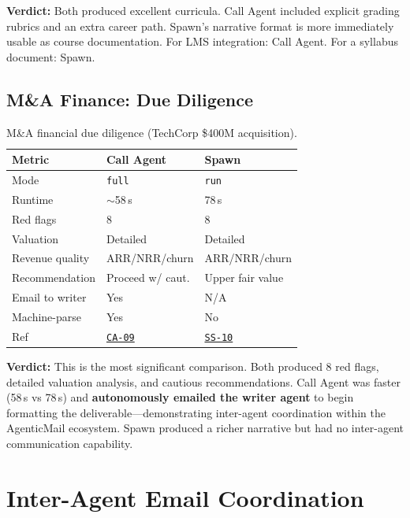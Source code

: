 \documentclass[11pt,twocolumn]{article}
\newcommand{\win}[1]{\cellcolor{winner}#1}
\newcommand{\lose}[1]{\cellcolor{loser}#1}
\newcommand{\tie}[1]{\cellcolor{tied}#1}
\newcommand{\ghbase}{https://github.com/agenticmail/agenticmail/blob/main/research/agent-rpc-vs-spawn}
\begin{document}
\textbf{Verdict:} Both produced excellent curricula. Call Agent included explicit grading rubrics and an extra career path. Spawn's narrative format is more immediately usable as course documentation. For LMS integration: Call Agent. For a syllabus document: Spawn.

\subsection{M\&A Finance: Due Diligence}

\begin{table}[H]
\centering
\caption{M\&A financial due diligence (TechCorp \$400M acquisition).}
\begin{tabular}{@{}p{2.2cm}p{2.1cm}p{2.1cm}@{}}
\toprule
\textbf{Metric} & \textbf{Call Agent} & \textbf{Spawn} \\
\midrule
Mode & \texttt{full} & \texttt{run} \\
Runtime & \win{$\sim$58\,s} & \lose{78\,s} \\
Red flags & \tie{8} & \tie{8} \\
Valuation & \tie{Detailed} & \tie{Detailed} \\
Revenue quality & \tie{ARR/NRR/churn} & \tie{ARR/NRR/churn} \\
Recommendation & \tie{Proceed w/ caut.} & \tie{Upper fair value} \\
Email to writer & \win{Yes} & \lose{N/A} \\
Machine-parse & \win{Yes} & \lose{No} \\
Ref & \href{\ghbase/results-callagent/09-ma-finance-full.md}{\texttt{CA-09}} & \href{\ghbase/results/10-ma-finance.md}{\texttt{SS-10}} \\
\bottomrule
\end{tabular}
\end{table}

\textbf{Verdict:} This is the most significant comparison. Both produced 8 red flags, detailed valuation analysis, and cautious recommendations. Call Agent was faster (58\,s vs 78\,s) and \textbf{autonomously emailed the writer agent} to begin formatting the deliverable---demonstrating inter-agent coordination within the AgenticMail ecosystem. Spawn produced a richer narrative but had no inter-agent communication capability.

\section{Inter-Agent Email Coordination}
\end{document}

